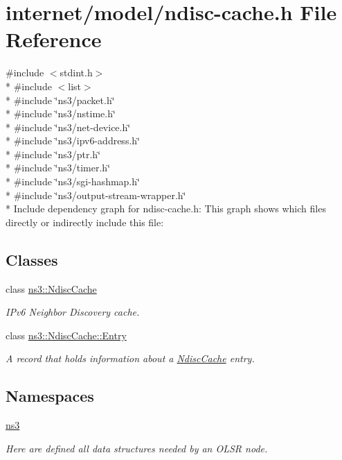 \hypertarget{ndisc-cache_8h}{}\section{internet/model/ndisc-\/cache.h File Reference}
\label{ndisc-cache_8h}
{\ttfamily \#include $<$stdint.\+h$>$}\\*
{\ttfamily \#include $<$list$>$}\\*
{\ttfamily \#include \char`\"{}ns3/packet.\+h\char`\"{}}\\*
{\ttfamily \#include \char`\"{}ns3/nstime.\+h\char`\"{}}\\*
{\ttfamily \#include \char`\"{}ns3/net-\/device.\+h\char`\"{}}\\*
{\ttfamily \#include \char`\"{}ns3/ipv6-\/address.\+h\char`\"{}}\\*
{\ttfamily \#include \char`\"{}ns3/ptr.\+h\char`\"{}}\\*
{\ttfamily \#include \char`\"{}ns3/timer.\+h\char`\"{}}\\*
{\ttfamily \#include \char`\"{}ns3/sgi-\/hashmap.\+h\char`\"{}}\\*
{\ttfamily \#include \char`\"{}ns3/output-\/stream-\/wrapper.\+h\char`\"{}}\\*
Include dependency graph for ndisc-\/cache.h\+:
This graph shows which files directly or indirectly include this file\+:
\subsection*{Classes}
\begin{DoxyCompactItemize}
\item 
class \hyperlink{classns3_1_1NdiscCache}{ns3\+::\+Ndisc\+Cache}
\begin{DoxyCompactList}\small\item\em I\+Pv6 Neighbor Discovery cache. \end{DoxyCompactList}\item 
class \hyperlink{classns3_1_1NdiscCache_1_1Entry}{ns3\+::\+Ndisc\+Cache\+::\+Entry}
\begin{DoxyCompactList}\small\item\em A record that holds information about a \hyperlink{classns3_1_1NdiscCache}{Ndisc\+Cache} entry. \end{DoxyCompactList}\end{DoxyCompactItemize}
\subsection*{Namespaces}
\begin{DoxyCompactItemize}
\item 
 \hyperlink{namespacens3}{ns3}
\begin{DoxyCompactList}\small\item\em Here are defined all data structures needed by an O\+L\+SR node. \end{DoxyCompactList}\end{DoxyCompactItemize}
